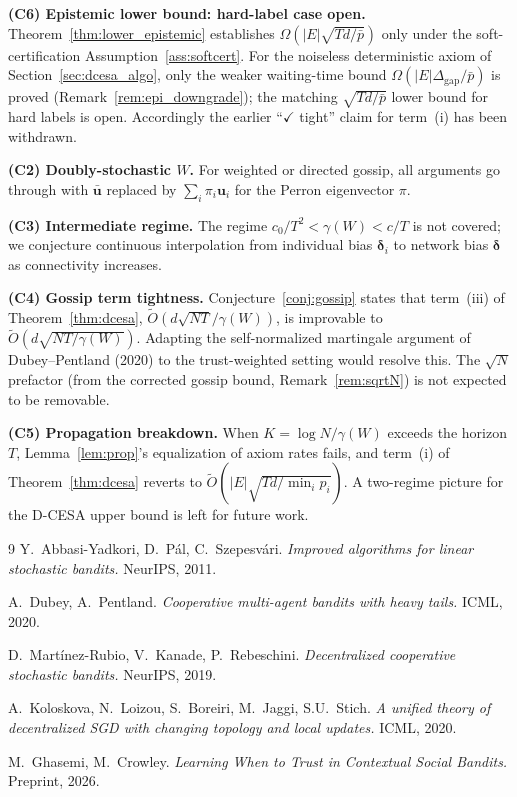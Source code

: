 \documentclass[11pt]{article}
\begin{document}
\textbf{(C6) Epistemic lower bound: hard-label case open.}
Theorem~\ref{thm:lower_epistemic} establishes
$\Omega(|E|\sqrt{Td/\bar p})$ only under the soft-certification
Assumption~\ref{ass:softcert}.  For the noiseless deterministic axiom
of Section~\ref{sec:dcesa_algo}, only the weaker waiting-time bound
$\Omega(|E|\Delta_{\mathrm{gap}}/\bar p)$ is proved
(Remark~\ref{rem:epi_downgrade}); the matching $\sqrt{Td/\bar p}$
lower bound for hard labels is open.  Accordingly the earlier
``$\checkmark$ tight'' claim for term~(i) has been withdrawn.

\textbf{(C2) Doubly-stochastic $W$.}
For weighted or directed gossip, all arguments go through with
$\bar{\bm{u}}$ replaced by $\sum_i\pi_i\bm{u}_i$ for the Perron
eigenvector $\pi$.

\textbf{(C3) Intermediate regime.}
The regime $c_0/T^2<\gamma(W)<c/T$ is not covered; we conjecture
continuous interpolation from individual bias $\bm{\delta}_i$ to
network bias $\bm{\delta}$ as connectivity increases.

\textbf{(C4) Gossip term tightness.}
Conjecture~\ref{conj:gossip} states that term~(iii)
of Theorem~\ref{thm:dcesa}, $\widetilde{O}(d\sqrt{NT}/\gamma(W))$, is
improvable to $\widetilde{O}(d\sqrt{NT/\gamma(W)})$.
Adapting the self-normalized martingale argument of
Dubey--Pentland (2020) to the trust-weighted setting
would resolve this.  The $\sqrt N$ prefactor (from the corrected
gossip bound, Remark~\ref{rem:sqrtN}) is not expected to be removable.

\textbf{(C5) Propagation breakdown.}
When $K=\log N/\gamma(W)$ exceeds the horizon $T$,
Lemma~\ref{lem:prop}'s equalization of axiom rates fails,
and term~(i) of Theorem~\ref{thm:dcesa} reverts to
$\widetilde{O}(|E|\sqrt{Td/\min_i p_i})$.
A two-regime picture for the D-CESA upper bound is left for
future work.

\begin{thebibliography}{9}
Y.~Abbasi-Yadkori, D.~P\'al, C.~Szepesv\'ari.
\textit{Improved algorithms for linear stochastic bandits.}
NeurIPS, 2011.

A.~Dubey, A.~Pentland.
\textit{Cooperative multi-agent bandits with heavy tails.}
ICML, 2020.

D.~Mart\'inez-Rubio, V.~Kanade, P.~Rebeschini.
\textit{Decentralized cooperative stochastic bandits.}
NeurIPS, 2019.

A.~Koloskova, N.~Loizou, S.~Boreiri, M.~Jaggi, S.U.~Stich.
\textit{A unified theory of decentralized SGD with changing topology
and local updates.}
ICML, 2020.

M.~Ghasemi, M.~Crowley.
\textit{Learning When to Trust in Contextual Social Bandits.}
Preprint, 2026.
\end{thebibliography}
\end{document}
